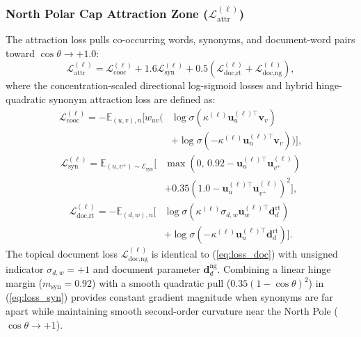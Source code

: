 \documentclass[journal]{IEEEtran}
\begin{document}
\subsubsection{North Polar Cap Attraction Zone ($\mathcal{L}_{\text{attr}}^{(\ell)}$)}
The attraction loss pulls co-occurring words, synonyms, and document-word pairs toward $\cos\theta \to +1.0$:
\begin{equation}
\mathcal{L}_{\text{attr}}^{(\ell)} = \mathcal{L}_{\text{cooc}}^{(\ell)} + 1.6\mathcal{L}_{\text{syn}}^{(\ell)} + 0.5\left(\mathcal{L}_{\text{doc,rt}}^{(\ell)} + \mathcal{L}_{\text{doc,ng}}^{(\ell)}\right),
\label{eq:loss_attr}
\end{equation}
where the concentration-scaled directional log-sigmoid losses and hybrid hinge-quadratic synonym attraction loss are defined as:
\begin{equation}
\begin{aligned}
\mathcal{L}_{\text{cooc}}^{(\ell)} = -\mathbb{E}_{(u,v), n}\Big[ w_{uv}\Big(&\log\sigma\!\left(\kappa^{(\ell)}\mathbf{u}_u^{(\ell)\top}\mathbf{v}_v\right) \\
&+ \log\sigma\!\left(-\kappa^{(\ell)}\mathbf{u}_n^{(\ell)\top}\mathbf{v}_v\right)\Big) \Big],
\end{aligned}
\label{eq:loss_cooc}
\end{equation}
\begin{equation}
\begin{aligned}
\mathcal{L}_{\text{syn}}^{(\ell)} = \mathbb{E}_{(u,v^+)\sim\mathcal{E}_{\text{syn}}}\Big[ &\max\!\left(0, \, 0.92 - \mathbf{u}_u^{(\ell)\top}\mathbf{u}_{v^+}^{(\ell)}\right) \\
&+ 0.35\left(1.0 - \mathbf{u}_u^{(\ell)\top}\mathbf{u}_{v^+}^{(\ell)}\right)^2 \Big],
\end{aligned}
\label{eq:loss_syn}
\end{equation}
\begin{equation}
\begin{aligned}
\mathcal{L}_{\text{doc,rt}}^{(\ell)} = -\mathbb{E}_{(d,w), n}\Big[ &\log\sigma\!\left(\kappa^{(\ell)}\sigma_{d,w}\mathbf{u}_w^{(\ell)\top}\mathbf{d}_d^{\text{rt}}\right) \\
&+ \log\sigma\!\left(-\kappa^{(\ell)}\mathbf{u}_n^{(\ell)\top}\mathbf{d}_d^{\text{rt}}\right) \Big].
\end{aligned}
\label{eq:loss_doc}
\end{equation}
The topical document loss $\mathcal{L}_{\text{doc,ng}}^{(\ell)}$ is identical to (\ref{eq:loss_doc}) with unsigned indicator $\sigma_{d,w} = +1$ and document parameter $\mathbf{d}_d^{\text{ng}}$. Combining a linear hinge margin ($m_{\text{syn}} = 0.92$) with a smooth quadratic pull ($0.35(1 - \cos\theta)^2$) in (\ref{eq:loss_syn}) provides constant gradient magnitude when synonyms are far apart while maintaining smooth second-order curvature near the North Pole ($\cos\theta \to +1$).
\end{document}
